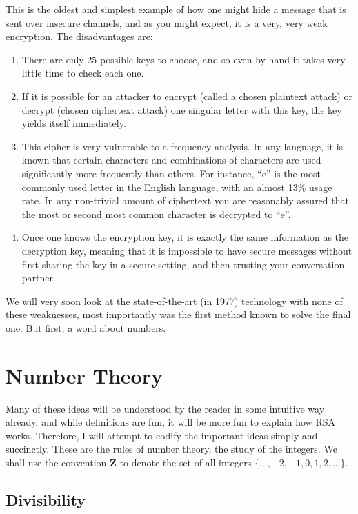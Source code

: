 \documentclass{article}
\begin{document}
        This is the oldest and simplest example of how one might hide a message that is sent over insecure channels, and as you might expect, it is a very, very weak encryption.
        The disadvantages are:
        \begin{enumerate}
            \item
            There are only 25 possible keys to choose, and so even by hand it takes very little time to check each one.
            \item
            If it is possible for an attacker to encrypt (called a chosen plaintext attack) or decrypt (chosen ciphertext attack) one singular letter with this key, the key yields itself immediately.
            \item
            This cipher is very vulnerable to a frequency analysis.  In any language, it is known that certain characters and combinations of characters are used significantly more frequently than others.  For instance, ``e'' is the most commonly used letter in the English language, with an almost 13\% usage rate.  In any non-trivial amount of ciphertext you are reasonably assured that the most or second most common character is decrypted to ``e''.
            \item
            Once one knows the encryption key, it is exactly the same information as the decryption key, meaning that it is impossible to have secure messages without first sharing the key in a secure setting, and then trusting your conversation partner.  
        \end{enumerate}
        
        We will very soon look at the state-of-the-art (in 1977) technology with none of these weaknesses, most importantly was the first method known to solve the final one.  
        But first, a word about numbers.
        
    \section{Number Theory}
        Many of these ideas will be understood by the reader in some intuitive way already, and while definitions are fun, it will be more fun to explain how RSA works.
        Therefore, I will attempt to codify the important ideas simply and succinctly.  
        These are the rules of number theory, the study of the integers.  We shall use the convention $\mathbf{Z}$ to denote the set of all integers $\{...,-2,-1,0,1,2,...\}$.
        
        \subsection{Divisibility} 
        
\end{document}
